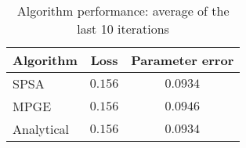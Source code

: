 \begin{table}[H]
    \centering
    \begin{tabular}{lcc}
    \toprule
    \textbf{Algorithm} & \textbf{Loss} & \textbf{Parameter error} \\
    \midrule
    SPSA & $0.156$ & $0.0934$ \\
MPGE & $0.156$ & $0.0946$ \\
Analytical & $0.156$ & $0.0934$ \\
\bottomrule
    \end{tabular}
    \caption{Algorithm performance: average of the last 10 iterations}
    \end{table}